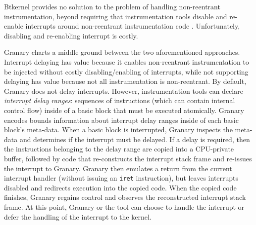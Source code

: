 \documentclass[preprint]{sigplanconf}
\newcommand{\toolname}[1]{{\scshape #1}}
\begin{document}
Btkernel provides no solution to the problem of handling non-reentrant instrumentation, beyond requiring that instrumentation tools disable and re-enable interrupts around non-reentrant instrumentation code \cite{btkernel}. Unfortunately, disabling and re-enabling interrupt is costly.

Granary charts a middle ground between the two aforementioned approaches. Interrupt delaying has value because it enables non-reentrant instrumentation to be injected without costly disabling/enabling of interrupts, while not supporting delaying has value because not all instrumentation is non-reentrant. By default, Granary does not delay interrupts. However, instrumentation tools can declare \emph{interrupt delay ranges}: sequences of instructions (which can contain internal control flow) inside of a basic block that must be executed atomically. Granary encodes bounds information about interrupt delay ranges inside of each basic block's meta-data. When a basic block is interrupted, Granary inspects the meta-data and determines if the interrupt must be delayed. If a delay is required, then the instructions belonging to the delay range are copied into a CPU-private buffer, followed by code that re-constructs the interrupt stack frame and re-issues the interrupt to Granary. Granary then emulates a return from the current interrupt handler (without issuing an \texttt{iret} instruction), but leaves interrupts disabled and redirects execution into the copied code. When the copied code finishes, Granary regains control and observes the reconstructed interrupt stack frame. At this point, Granary or the tool can choose to handle the interrupt or defer the handling of the interrupt to the kernel.

\end{document}
